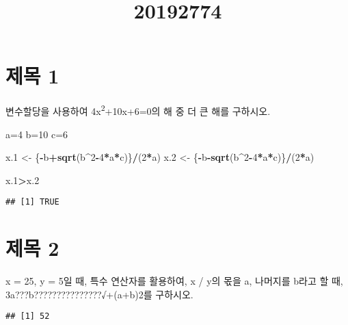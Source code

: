 \documentclass[]{article}
\title{20192774}
\author{}
\date{}
\newenvironment{Shaded}{\begin{snugshade}}{\end{snugshade}}
\newcommand{\KeywordTok}[1]{\textcolor[rgb]{0.13,0.29,0.53}{\textbf{#1}}}
\newcommand{\DecValTok}[1]{\textcolor[rgb]{0.00,0.00,0.81}{#1}}
\newcommand{\StringTok}[1]{\textcolor[rgb]{0.31,0.60,0.02}{#1}}
\newcommand{\ControlFlowTok}[1]{\textcolor[rgb]{0.13,0.29,0.53}{\textbf{#1}}}
\newcommand{\OperatorTok}[1]{\textcolor[rgb]{0.81,0.36,0.00}{\textbf{#1}}}
\newcommand{\NormalTok}[1]{#1}
\begin{document}
\maketitle

\section{제목 1}\label{-1}

변수할당을 사용하여 4x\textsuperscript{2}+10x+6=0의 해 중 더 큰 해를
구하시오.

\begin{Shaded}
\begin{Highlighting}[]
\NormalTok{a=}\DecValTok{4}
\NormalTok{b=}\DecValTok{10}
\NormalTok{c=}\DecValTok{6}

\NormalTok{x.}\DecValTok{1}\NormalTok{ <-}\StringTok{ }\NormalTok{\{}\OperatorTok{-}\NormalTok{b}\OperatorTok{+}\KeywordTok{sqrt}\NormalTok{(b}\OperatorTok{^}\DecValTok{2}\OperatorTok{-}\DecValTok{4}\OperatorTok{*}\NormalTok{a}\OperatorTok{*}\NormalTok{c)\}}\OperatorTok{/}\NormalTok{(}\DecValTok{2}\OperatorTok{*}\NormalTok{a)}
\NormalTok{x.}\DecValTok{2}\NormalTok{ <-}\StringTok{ }\NormalTok{\{}\OperatorTok{-}\NormalTok{b}\OperatorTok{-}\KeywordTok{sqrt}\NormalTok{(b}\OperatorTok{^}\DecValTok{2}\OperatorTok{-}\DecValTok{4}\OperatorTok{*}\NormalTok{a}\OperatorTok{*}\NormalTok{c)\}}\OperatorTok{/}\NormalTok{(}\DecValTok{2}\OperatorTok{*}\NormalTok{a)}

\NormalTok{x.}\DecValTok{1}\OperatorTok{>}\NormalTok{x.}\DecValTok{2}
\end{Highlighting}
\end{Shaded}

\begin{verbatim}
## [1] TRUE
\end{verbatim}

\section{제목 2}\label{-2}

x = 25, y = 5일 때, 특수 연산자를 활용하여, x / y의 몫을 a, 나머지를
b라고 할 때, 3a???b???????????????√+(a+b)2를 구하시오.

\begin{Shaded}
\end{Shaded}

\begin{verbatim}
## [1] 52
\end{verbatim}
\end{document}
